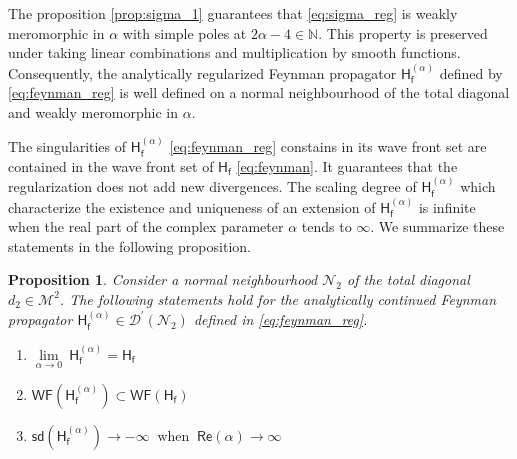 \documentclass[11pt]{book}
\newcommand{\hilight}[1]{\colorbox{yellow!80!black}{#1}}
\newcommand{\WF}{\mathsf{WF}}
\newcommand{\sd}{\mathsf{sd}}
\renewcommand{\Re}{\mathsf{Re}}
\newcommand{\Dcal}{\mathcal{D}}
\newcommand{\Mcal}{\mathcal{M}}
\newcommand{\Ncal}{\mathcal{N}}
\newcommand{\Nbb}{\mathbb{N}}
\newcommand{\Hsf}{\mathsf{H}}
\newcommand{\fsf}{\mathsf{f}}
\theoremstyle{break}
\newtheorem{proposition}{Proposition}[chapter]
\begin{document}
The proposition \ref{prop:sigma_1} guarantees that \eqref{eq:sigma_reg} is weakly meromorphic in $\alpha$ with simple poles at $2\alpha-4\in\Nbb$. This property is preserved under taking linear combinations and multiplication by smooth functions. Consequently, the analytically regularized Feynman propagator $\Hsf^{(\alpha)}_\fsf$ defined by \eqref{eq:feynman_reg} is well defined on a normal neighbourhood of the total diagonal and weakly meromorphic in $\alpha$. 


The singularities of $\Hsf^{(\alpha)}_\fsf$ \eqref{eq:feynman_reg} constains in its wave front set are contained in the wave front set of $\Hsf_\fsf$ \eqref{eq:feynman}. It guarantees that the regularization does not add new divergences. The scaling degree of $\Hsf^{(\alpha)}_\fsf$  which characterize the existence and uniqueness of an extension of $\Hsf^{(\alpha)}_\fsf$ is infinite when the real part of the complex parameter $\alpha$ tends to $\infty$. We summarize these statements in the following proposition.


\begin{proposition}\label{prop:wf_h_reg}
Consider a normal neighbourhood $\Ncal_2$ of the total diagonal $d_2\in\Mcal^2$. The following statements hold for the analytically continued Feynman propagator $\Hsf^{(\alpha)}_\fsf\in\Dcal^\prime(\Ncal_2)$ defined in \eqref{eq:feynman_reg}.
%
\begin{enumerate}
\item\label{item:1_wf_h_reg} $\underset{\alpha \to 0}{\lim} \ \Hsf^{(\alpha)}_\fsf = \Hsf_\fsf$
%
\item\label{item:2_wf_h_reg} $\WF\left(\Hsf^{(\alpha)}_\fsf\right) \subset \WF\left(\Hsf_\fsf\right)$
%
\item\label{item:3_wf_h_reg} \hilight{$\sd\left(\Hsf^{(\alpha)}_\fsf\right) \to - \infty \ \mbox{ when } \ \Re\left(\alpha\right) \to \infty$}
\end{enumerate}
%
\end{proposition}
\end{document}

